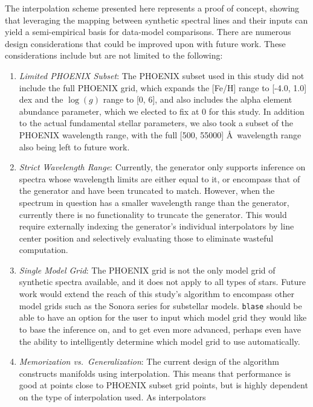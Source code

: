 \documentclass[twocolumn]{aastex631}
\begin{document}
The interpolation scheme presented here represents a proof of concept, showing that leveraging the mapping between synthetic spectral lines and their inputs can yield a semi-empirical basis for data-model comparisons.  There are numerous design considerations that could be improved upon with 
future work. These considerations include but are not limited to the 
following:
\begin{enumerate}[label=-]
    \item \textit{Limited PHOENIX Subset}: The PHOENIX subset used in this 
    study did not include the full PHOENIX grid, which expands 
    the [Fe/H] range to [-4.0, 1.0] dex and the $\log(g)$ range to [0, 6], 
    and also includes the alpha element abundance parameter, which we 
    elected to fix at 0 for this study. In addition to the actual fundamental 
    stellar parameters, we also took a subset of the PHOENIX wavelength range, 
    with the full [500, 55000] \AA \ wavelength range also being left to 
    future work.
    \item \textit{Strict Wavelength Range}: Currently, the generator only 
    supports inference on spectra whose wavelength limits are either equal 
    to it, or encompass that of the generator and have been truncated to 
    match. However, when the spectrum in question has a smaller wavelength 
    range than the generator, currently there is no functionality to truncate 
    the generator. This would require externally indexing the generator's 
    individual interpolators by line center position and selectively
    evaluating those to eliminate wasteful computation.
    \item \textit{Single Model Grid}: The PHOENIX grid is not the only model
    grid of synthetic spectra available, and it does not apply to all types 
    of stars. Future work would extend the reach of this study's algorithm 
    to encompass other model grids such as the Sonora series for substellar
    models. \texttt{blase} should be able to have an option for the user to 
    input which model grid they would like to base the inference on, and 
    to get even more advanced, perhaps even have the ability to intelligently
    determine which model grid to use automatically.
    \item \textit{Memorization vs.\ Generalization}: The current design of
    the algorithm constructs manifolds using interpolation. This means that
    performance is good at points close to PHOENIX subset grid points, but
    is highly dependent on the type of interpolation used. As interpolators

\end{enumerate}
\end{document}
